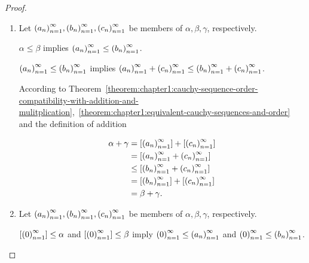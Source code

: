 \begin{proof}
    \begin{enumerate}[label={(\roman*)}]
        \item Let $\seq{a_{n}}, \seq{b_{n}}, \seq{c_{n}}$ be members of $\alpha, \beta, \gamma$, respectively.

              $\alpha\le\beta$ implies $\seq{a_{n}}\le\seq{b_{n}}$.

              $\seq{a_{n}}\le\seq{b_{n}}$ implies $\seq{a_{n}} + \seq{c_{n}}\le\seq{b_{n}} + \seq{c_{n}}$.

              According to Theorem~\ref{theorem:chapter1:cauchy-sequence-order-compatibility-with-addition-and-mulitplication},~\ref{theorem:chapter1:equivalent-cauchy-sequences-and-order} and the definition of addition

              \begin{align*}
                  \alpha + \gamma & = \class{\seq{a_{n}}} + \class{\seq{c_{n}}} \\
                                  & = \class{\seq{a_{n}} + \seq{c_{n}}}         \\
                                  & \le\class{\seq{b_{n}} + \seq{c_{n}}}        \\
                                  & = \class{\seq{b_{n}}} + \class{\seq{c_{n}}} \\
                                  & = \beta + \gamma.
              \end{align*}
        \item Let $\seq{a_{n}}, \seq{b_{n}}, \seq{c_{n}}$ be members of $\alpha, \beta, \gamma$, respectively.

              $\class{\seq{0}}\le\alpha$ and $\class{\seq{0}}\le\beta$ imply $\seq{0}\le\seq{a_{n}}$ and $\seq{0}\le\seq{b_{n}}$.


\end{enumerate}
\end{proof}
